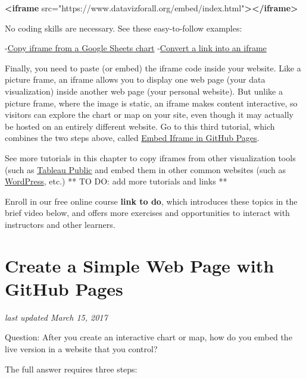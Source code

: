 \documentclass[
  english,
]{book}
\newenvironment{Shaded}{\begin{snugshade}}{\end{snugshade}}
\newcommand{\KeywordTok}[1]{\textcolor[rgb]{0.13,0.29,0.53}{\textbf{#1}}}
\newcommand{\OtherTok}[1]{\textcolor[rgb]{0.56,0.35,0.01}{#1}}
\newcommand{\StringTok}[1]{\textcolor[rgb]{0.31,0.60,0.02}{#1}}
\begin{document}
\begin{Shaded}
\begin{Highlighting}[]
\KeywordTok{<iframe}\OtherTok{ src=}\StringTok{"https://www.datavizforall.org/embed/index.html"}\KeywordTok{></iframe>}
\end{Highlighting}
\end{Shaded}

No coding skills are necessary. See these easy-to-follow examples:

-\href{iframe-google-sheets/}{Copy iframe from a Google Sheets chart}
-\href{link-to-iframe}{Convert a link into an iframe}

Finally, you need to paste (or embed) the iframe code inside your website. Like a picture frame, an iframe allows you to display one web page (your data visualization) inside another web page (your personal website). But unlike a picture frame, where the image is static, an iframe makes content interactive, so visitors can explore the chart or map on your site, even though it may actually be hosted on an entirely different website. Go to this third tutorial, which combines the two steps above, called \href{iframe-github}{Embed Iframe in GitHub Pages}.

See more tutorials in this chapter to copy iframes from other visualization tools (such as \href{iframe-tableau}{Tableau Public} and embed them in other common websites (such as \href{iframe-wordpress}{WordPress}, etc.) ** TO DO: add more tutorials and links **

Enroll in our free online course \textbf{link to do}, which introduces these topics in the brief video below, and offers more exercises and opportunities to interact with instructors and other learners.

\hypertarget{github-pages}{%
\section{Create a Simple Web Page with GitHub Pages}\label{github-pages}}

\emph{last updated March 15, 2017}

Question: After you create an interactive chart or map, how do you embed the live version in a website that you control?

The full answer requires three steps:
\end{document}
